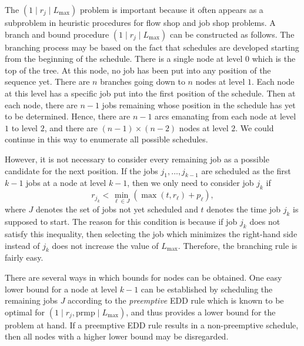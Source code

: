 The $(1 \mid r_j \mid L_{\max})$ problem is important because it often 
appears as a subproblem in heuristic procedures for flow shop and job shop 
problems. A branch and bound procedure $(1 \mid r_j \mid L_{\max})$ 
can be constructed as follows. The branching process may be based on the 
fact that schedules are developed starting from the beginning of the schedule. 
There is a single node at level $0$ which is the top of the tree. At this 
node, no job has been put into any position of the sequence yet. There are 
$n$ branches going down to $n$ nodes at level $1$. Each node at this level 
has a specific job put into the first position of the schedule. Then
at each node, there are $n-1$ jobs remaining whose position in the schedule 
has yet to be determined. Hence, there are $n-1$ arcs emanating from each 
node at level $1$ to level $2$, and there are $(n-1) \times (n-2)$ nodes at 
level $2$. We could continue in this way to enumerate all possible schedules. 

However, it is not necessary to consider every remaining job as a possible 
candidate for the next position. If the jobs $j_1, \dots, j_{k-1}$ 
are scheduled as the first $k-1$ jobs at a node at level $k-1$, then 
we only need to consider job $j_k$ if 
\[ r_{j_k} < \min_{\ell \in J} \left( \max(t, r_\ell) + p_\ell \right), \] 
where $J$ denotes the set of jobs not yet scheduled and $t$ denotes the 
time job $j_k$ is supposed to start. The reason for this condition is because 
if job $j_k$ does not satisfy this inequality, then selecting the job 
which minimizes the right-hand side instead of $j_k$ does not increase the 
value of $L_{\max}$. Therefore, the branching rule is fairly easy. 

There are several ways in which bounds for nodes can be obtained. 
One easy lower bound for a node at level $k-1$ can be established by 
scheduling the remaining jobs $J$ according to the \emph{preemptive} 
EDD rule which is known to be optimal for $(1 \mid r_j, \text{prmp} \mid 
L_{\max})$, and thus provides a lower bound for the problem at hand. 
If a preemptive EDD rule results in a non-preemptive schedule, then 
all nodes with a higher lower bound may be disregarded. 

